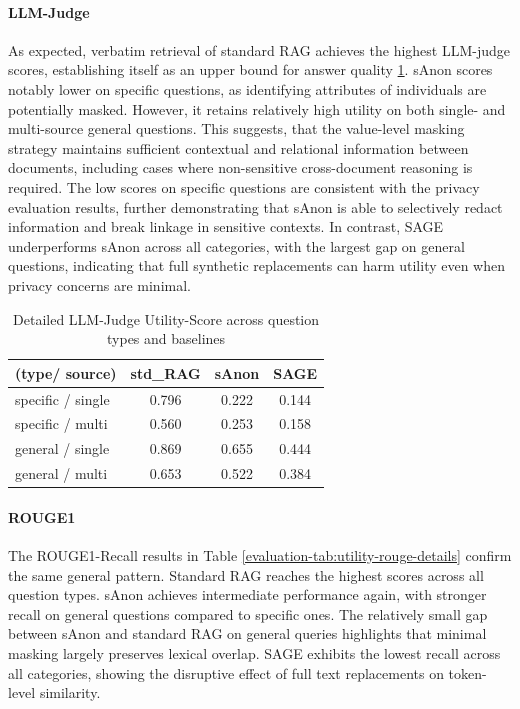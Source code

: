 \paragraph{LLM-Judge}
As expected, verbatim retrieval of standard RAG achieves the highest LLM-judge scores, establishing itself as an upper bound for answer quality \ref{evaluation-tab:utility-llm-details}. sAnon scores notably lower on specific questions, as identifying attributes of individuals are potentially masked. However, it retains relatively high utility on both single- and multi-source general questions. 
This suggests, that the value-level masking strategy maintains sufficient contextual and relational information between documents, including cases where non-sensitive cross-document reasoning is required. The low scores on specific questions are consistent with the privacy evaluation results, further demonstrating that sAnon is able to selectively redact information and break linkage in sensitive contexts.
In contrast, SAGE underperforms sAnon across all categories, with the largest gap on general questions, indicating that full synthetic replacements can harm utility even when privacy concerns are minimal.

\begin{table}[h!]
\centering
\caption{Detailed LLM-Judge Utility-Score across question types and baselines}
\label{evaluation-tab:utility-llm-details}
\begin{tabular}{l c c c}
\toprule
\textbf{(type/ source)} & \textbf{std\_RAG} & \textbf{sAnon} & \textbf{SAGE} \\
\midrule
specific / single & 0.796 & 0.222 & 0.144 \\
specific / multi & 0.560 & 0.253 & 0.158 \\
general / single & 0.869 & 0.655 & 0.444 \\
general / multi & 0.653 & 0.522 & 0.384 \\
\bottomrule
\end{tabular}
\end{table}


\paragraph{ROUGE1}
The ROUGE1-Recall results in Table \ref{evaluation-tab:utility-rouge-details} confirm the same general pattern. Standard RAG reaches the highest scores across all question types. sAnon achieves intermediate performance again, with stronger recall on general questions compared to specific ones. The relatively small gap between sAnon and standard RAG on general queries highlights that minimal masking largely preserves lexical overlap. SAGE exhibits the lowest recall across all categories, showing the disruptive effect of full text replacements on token-level similarity.


